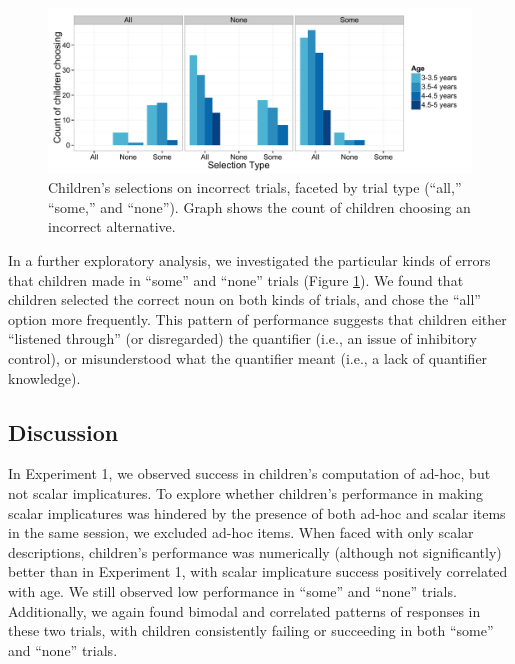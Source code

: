 \documentclass[man]{apa2}
\begin{document}
\begin{figure} 
 \begin{center} 
  \includegraphics[scale=.5]{figures/exp2_wrong.pdf} 
  \caption{\label{fig:exp2_wrong} Children's selections on incorrect trials, faceted by trial type (``all,'' ``some,'' and ``none''). Graph shows the count of children choosing an incorrect alternative.} 
 \end{center} 
\end{figure}

In a further exploratory analysis, we investigated the particular kinds of errors that children made in ``some'' and ``none'' trials (Figure \ref{fig:exp2_wrong}). We found that children selected the correct noun on both kinds of trials, and chose the ``all'' option more frequently. This pattern of performance suggests that children either ``listened through'' (or disregarded) the quantifier (i.e., an issue of inhibitory control), or misunderstood what the quantifier meant (i.e., a lack of quantifier knowledge). 


\subsection{Discussion}

In Experiment 1, we observed success in children's computation of ad-hoc, but not scalar implicatures. To explore whether children's performance in making scalar implicatures was hindered by the presence of both ad-hoc and scalar items in the same session, we excluded ad-hoc items. When faced with only scalar descriptions, children's performance was numerically (although not significantly) better than in Experiment 1, with scalar implicature success positively correlated with age. We still observed low performance in ``some'' and ``none'' trials. Additionally, we again found bimodal and correlated patterns of responses in these two trials, with children consistently failing or succeeding in both ``some'' and ``none'' trials. 
\end{document}
